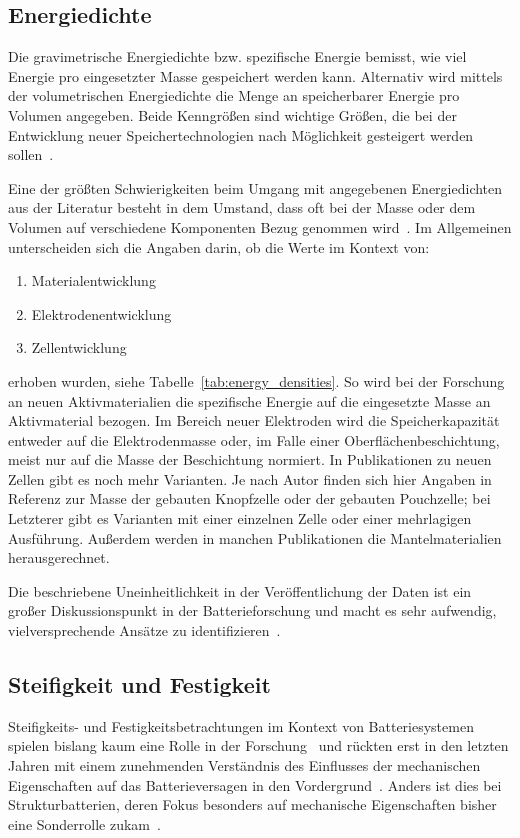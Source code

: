 \subsection{Energiedichte}
Die gravimetrische Energiedichte bzw. spezifische Energie bemisst, wie viel Energie pro eingesetzter Masse gespeichert werden kann. Alternativ wird mittels der volumetrischen Energiedichte die Menge an speicherbarer Energie pro Volumen angegeben. Beide Kenngrößen sind wichtige Größen, die bei der Entwicklung neuer Speichertechnologien nach Möglichkeit gesteigert werden sollen~\cite{Plett2015}.

Eine der größten Schwierigkeiten beim Umgang mit angegebenen Energiedichten aus der Literatur besteht in dem Umstand, dass oft bei der Masse oder dem Volumen auf verschiedene Komponenten Bezug genommen wird~\cite{Son2021}. Im Allgemeinen unterscheiden sich die Angaben darin, ob die Werte im Kontext von:
\begin{enumerate}
	\item Materialentwicklung
	\item Elektrodenentwicklung
	\item Zellentwicklung
\end{enumerate}
erhoben wurden, siehe Tabelle~\ref{tab:energy_densities}.
So wird bei der Forschung an neuen Aktivmaterialien die spezifische Energie auf die eingesetzte Masse an Aktivmaterial bezogen. Im Bereich neuer Elektroden wird die Speicherkapazität entweder auf die Elektrodenmasse oder, im Falle einer Oberflächenbeschichtung, meist nur auf die Masse der Beschichtung normiert. In Publikationen zu neuen Zellen gibt es noch mehr Varianten. Je nach Autor finden sich hier Angaben in Referenz zur Masse der gebauten Knopfzelle oder der gebauten Pouchzelle; bei Letzterer gibt es Varianten mit einer einzelnen Zelle oder einer mehrlagigen Ausführung. Außerdem werden in manchen Publikationen die Mantelmaterialien herausgerechnet.

Die beschriebene Uneinheitlichkeit in der Veröffentlichung der Daten ist ein großer Diskussionspunkt in der Batterieforschung und macht es sehr aufwendig, vielversprechende Ansätze zu identifizieren~\cite{Greenhalgh2023, Zschiebsch2024}.

\subsection{Steifigkeit und Festigkeit}
Steifigkeits- und Festigkeitsbetrachtungen im Kontext von Batteriesystemen spielen bislang kaum eine Rolle in der Forschung~\cite{Chen2024a} und rückten erst in den letzten Jahren mit einem zunehmenden Verständnis des Einflusses der mechanischen Eigenschaften auf das Batterieversagen in den Vordergrund~\cite{Zhu2023}. Anders ist dies bei Strukturbatterien, deren Fokus besonders auf mechanische Eigenschaften bisher eine Sonderrolle zukam~\cite{Asp2021}.

